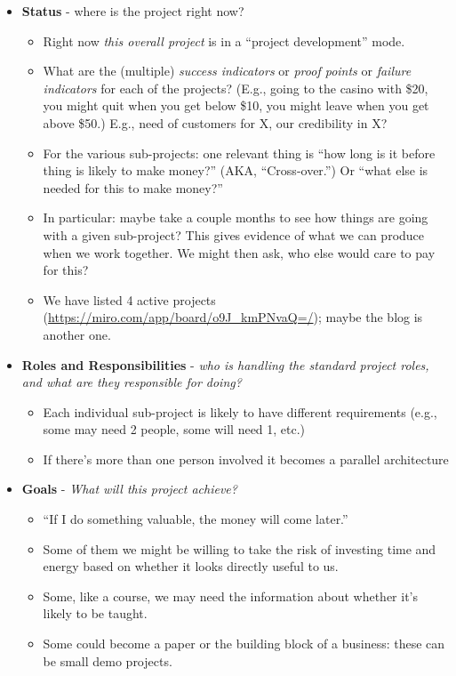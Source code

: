\documentclass[11pt]{article}
\begin{document}
\begin{itemize}
\item \textbf{Status} - where is the project right now?
\begin{itemize}
\item Right now \emph{this overall project} is in a “project development” mode.
\item What are the (multiple) \emph{success indicators} or \emph{proof points} or \emph{failure indicators} for each of the projects? (E.g., going to the casino with \$20, you might quit when you get below \$10, you might leave when you get above \$50.) E.g., need of customers for X, our credibility in X?
\item For the various sub-projects: one relevant thing is “how long is it before thing is likely to make money?” (AKA, “Cross-over.”) Or “what else is needed for this to make money?”
\item In particular: maybe take a couple months to see how things are going with a given sub-project? This gives evidence of what we can produce when we work together. We might then ask, who else would care to pay for this?
\item We have listed 4 active projects (\url{https://miro.com/app/board/o9J\_kmPNvaQ=/}); maybe the blog is another one.
\end{itemize}
\item \textbf{Roles and Responsibilities} - \emph{who is handling the standard project roles, and what are they responsible for doing?}
\begin{itemize}
\item Each individual sub-project is likely to have different requirements (e.g., some may need 2 people, some will need 1, etc.)
\item If there’s more than one person involved it becomes a parallel architecture
\end{itemize}
\item \textbf{Goals} - \emph{What will this project achieve?}
\begin{itemize}
\item “If I do something valuable, the money will come later.”
\item Some of them we might be willing to take the risk of investing time and energy based on whether it looks directly useful to us.
\item Some, like a course, we may need the information about whether it’s likely to be taught.
\item Some could become a paper or the building block of a business: these can be small demo projects.

\end{itemize}
\end{itemize}
\end{document}
